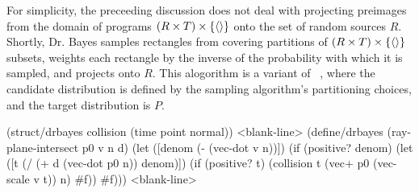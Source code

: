 For simplicity, the preceeding discussion does not deal with projecting preimages from the domain of programs $(R \times T) \times \{{\langle{}\rangle}\}$ onto the set of random sources $R$.
Shortly, Dr. Bayes samples rectangles from covering partitions of $(R \times T) \times \{{\langle{}\rangle}\}$ subsets, weights each rectangle by the inverse of the probability with which it is sampled, and projects onto $R$.
This alogorithm is a variant of ~\cite[Section 12.4]{cit:degroot-2012book-probability}, where the candidate distribution is defined by the sampling algorithm's partitioning choices, and the target distribution is $P$.

\begin{lrbox}{\codebox}
\begin{varwidth}{\textwidth}
\singlespacing
\begin{schemedisplay}
(struct/drbayes collision (time point normal))
<blank-line>
(define/drbayes (ray-plane-intersect p0 v n d)
  (let ([denom  (- (vec-dot v n))])
    (if (positive? denom)
        (let ([t  (/ (+ d (vec-dot p0 n)) denom)])
          (if (positive? t) (collision t (vec+ p0 (vec-scale v t)) n) #f))
        #f)))
<blank-line>
\end{schemedisplay}
\end{varwidth}
\end{lrbox}

